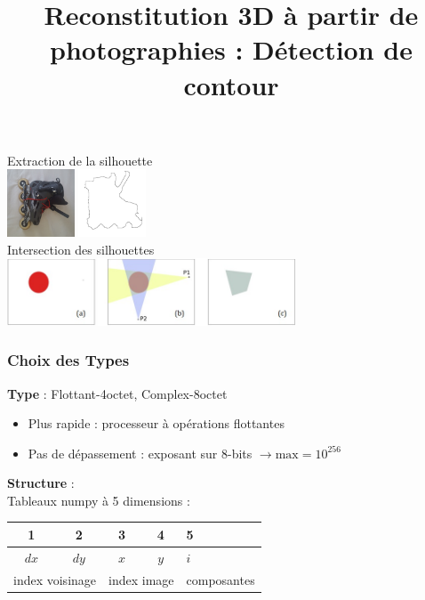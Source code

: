 \documentclass[french]{beamer}
\title{Reconstitution 3D à partir de photographies : Détection de contour}
\author{}
\date{}
\begin{document}

\begin{frame}
	\maketitle
	\vspace{-3cm}
	Extraction de la silhouette\\
	\medskip
	\includegraphics[width=2cm]{images/roller.png} \; \includegraphics[width=2cm]{images/roller_contourn.jpg}\\
	Intersection des silhouettes\\
	\medskip
	\includegraphics[height=2cm]{images/silhouettes.jpg}
\end{frame}

\begin{frame}
	\frametitle{Choix des Types}
	\textbf{Type} : Flottant-4octet, Complex-8octet
	\smallskip
	\begin{itemize}
		\item Plus rapide : processeur à opérations flottantes
		\item Pas de dépassement : exposant sur 8-bits $\longrightarrow \text{max} =  10^{256}$
	\end{itemize}
	\bigskip
	\textbf{Structure} : \\
	\smallskip
	Tableaux numpy à 5 dimensions : \\
	\begin{tabular}{|c|c|c|c|l|}
		\hline
		1 & 2 & 3 & 4 & 5 \\ \hline
		$dx$ & $dy$ & $x$ & $y$ & $i$ \\ \hline
		\multicolumn{2}{|l|}{index voisinage} & \multicolumn{2}{|l|}{index image} & composantes \\
		\hline
	\end{tabular}
\end{frame}
\end{document}
